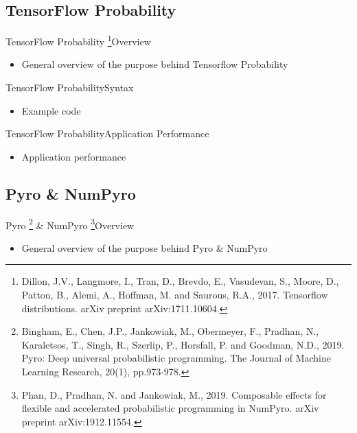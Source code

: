 \documentclass[AERbeamer%
              ,optEnglish%
              ,optBiber%
              ,optBibstyleAlphabetic%
              ,optBeamerClassicFormat%
              ]{AERlatex}%
\begin{document}
\subsection{TensorFlow Probability}
\begin{frame}[c]{TensorFlow Probability \footnote{Dillon, J.V., Langmore, I., Tran, D., Brevdo, E., Vasudevan, S.,
                                                  Moore, D., Patton, B., Alemi, A., Hoffman, M. and Saurous, R.A., 2017.
                                                  Tensorflow distributions. arXiv preprint arXiv:1711.10604.}}{Overview}
    \centering
    \begin{itemize}
        \item General overview of the purpose behind Tensorflow Probability
    \end{itemize}
\end{frame}


\begin{frame}[c]{TensorFlow Probability}{Syntax}
    \centering
    \begin{itemize}
        \item Example code
    \end{itemize}
\end{frame}


\begin{frame}[c]{TensorFlow Probability}{Application Performance}
    \centering
    \begin{itemize}
        \item Application performance
    \end{itemize}
\end{frame}


\subsection{Pyro \& NumPyro}
\begin{frame}[c]{Pyro \footnote{Bingham, E., Chen, J.P., Jankowiak, M., Obermeyer, F., Pradhan, N., Karaletsos, T.,
                                Singh, R., Szerlip, P., Horsfall, P. and Goodman, N.D., 2019. Pyro: Deep universal
                                probabilistic programming. The Journal of Machine Learning Research, 20(1), pp.973-978.}
                \& NumPyro \footnote{Phan, D., Pradhan, N. and Jankowiak, M., 2019. Composable effects for flexible and
                                     accelerated probabilistic programming in NumPyro. arXiv preprint arXiv:1912.11554.}}{Overview}
    \centering
    \begin{itemize}
        \item General overview of the purpose behind Pyro \& NumPyro
    \end{itemize}
\end{frame}
\end{document}
